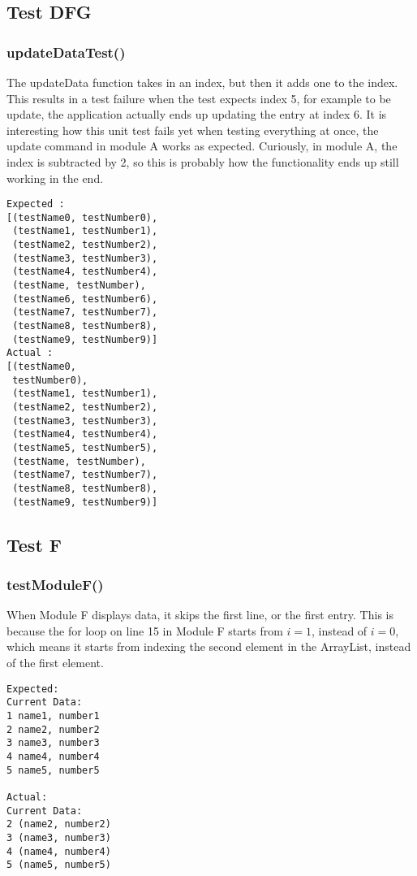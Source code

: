 \subsection{Test DFG}
\subsubsection{updateDataTest()}
The updateData function takes in an index, but then it adds one to the index.
This results in a test failure when the test expects index 5, for example to be
update, the application actually ends up updating the entry at index 6.
It is interesting how this unit test fails yet when testing everything at once,
the update command in module A works as expected. Curiously, in module A,
the index is subtracted by 2, so this is probably how the functionality
ends up still working in the end.

\begin{verbatim}
Expected :
[(testName0, testNumber0),
 (testName1, testNumber1),
 (testName2, testNumber2),
 (testName3, testNumber3),
 (testName4, testNumber4),
 (testName, testNumber),
 (testName6, testNumber6),
 (testName7, testNumber7),
 (testName8, testNumber8),
 (testName9, testNumber9)]
Actual :
[(testName0,
 testNumber0),
 (testName1, testNumber1),
 (testName2, testNumber2),
 (testName3, testNumber3),
 (testName4, testNumber4),
 (testName5, testNumber5),
 (testName, testNumber),
 (testName7, testNumber7),
 (testName8, testNumber8),
 (testName9, testNumber9)]
\end{verbatim}

\subsection{Test F}
\subsubsection{testModuleF()}
When Module F displays data, it skips the first line, or the first entry. This
is because the for loop on line 15 in Module F starts from $i=1$, instead of
$i=0$, which means it starts from indexing the second element in the ArrayList,
instead of the first element.

\begin{verbatim}
Expected:
Current Data:
1 name1, number1
2 name2, number2
3 name3, number3
4 name4, number4
5 name5, number5

Actual:
Current Data:
2 (name2, number2)
3 (name3, number3)
4 (name4, number4)
5 (name5, number5)
\end{verbatim}

